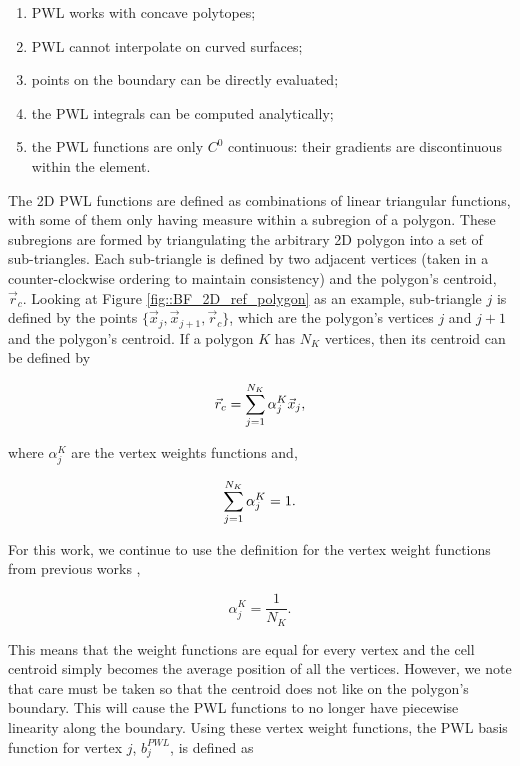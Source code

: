 \begin{enumerate}
\item PWL works with concave polytopes;
\item PWL cannot interpolate on curved surfaces;
\item points on the boundary can be directly evaluated;
\item the PWL integrals can be computed analytically;
\item the PWL functions are only $C^0$ continuous: their gradients are discontinuous within the element.
\end{enumerate}

The 2D PWL functions are defined as combinations of linear triangular functions, with some of them only having measure within a subregion of a polygon. These subregions are formed by triangulating the arbitrary 2D polygon into a set of sub-triangles. Each sub-triangle is defined by two adjacent vertices (taken in a counter-clockwise ordering to maintain consistency) and the polygon's centroid, $\vec{r}_{c}$. Looking at Figure \ref{fig::BF_2D_ref_polygon} as an example, sub-triangle $j$ is defined by the points $\{ \vec{x}_j , \vec{x}_{j+1}, \vec{r}_c \}$, which are the polygon's vertices $j$ and $j+1$ and the polygon's centroid. If a polygon $K$ has $N_K$ vertices, then its centroid can be defined by

\begin{equation}
\label{eq::PWL_2D_centroid}
	\vec{r}_{c} =  \sum\displaylimits_{j=1}^{N_K} \alpha_{j}^{K}  \vec{x}_j ,
\end{equation}

\noindent where $\alpha_{j}^{K}$ are the vertex weights functions and, 

\begin{equation}
\label{eq::PWL_2D_vertex_weight_sum}
 \sum\displaylimits_{j=1}^{N_K} \alpha_{j}^{K} = 1.
\end{equation}

\noindent For this work, we continue to use the definition for the vertex weight functions from previous works \cite{ref::PWLD_stone_adams,ref::PWLD_stone_adams_unstructured,bailey2008phd},

\begin{equation}
\label{eq::PWL_2D_vertex_weight_val}
\alpha_{j}^{K} = \frac{1}{N_K} .
\end{equation}

\noindent This means that the weight functions are equal for every vertex and the cell centroid simply becomes the average position of all the vertices. However, we note that care must be taken so that the centroid does not like on the polygon's boundary. This will cause the PWL functions to no longer have piecewise linearity along the boundary. Using these vertex weight functions, the PWL basis function for vertex $j$, $b_j^{PWL}$, is defined as

